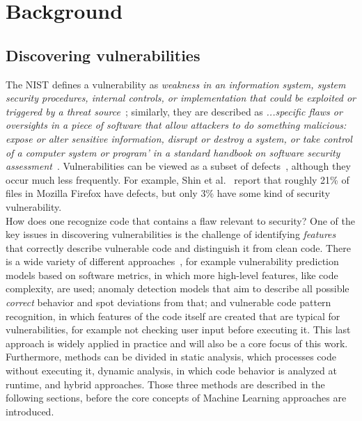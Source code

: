 \documentclass[
a4paper,
pagesize,
pdftex,
12pt,
twoside, %
BCOR=5mm, %
ngerman,
fleqn,
final,
]{scrartcl}
\begin{document}
	\newpage
	\section{Background}\label{Background}
	
	\subsection{Discovering vulnerabilities}
	
	The NIST defines a vulnerability as \textit{weakness in an information system, system security procedures, internal controls, or implementation that could be exploited or triggered by a threat source}~\cite{NISTComputerSecurityRessourceCenter.}; similarly, they are described as \textit{...specific flaws or oversights in a piece of software that allow attackers to do something malicious: expose or alter sensitive information, disrupt or destroy a system, or take control of a computer system or program' in a standard handbook on software security assessment}~\cite{Dowd.2006}.
	Vulnerabilities can be viewed as a subset of defects~\cite{Morrison.2015}, although they occur much less frequently. For example, Shin et al.~\cite{Shin.2013} report that roughly 21\% of files in Mozilla Firefox have defects, but only 3\% have some kind of security vulnerability. \\
	How does one recognize code that contains a flaw relevant to security? One of the key issues in discovering vulnerabilities is the challenge of identifying \textit{features} that correctly describe vulnerable code and distinguish it from clean code. There is a wide variety of different approaches~\cite{Ghaffarian.2017}, for example vulnerability prediction models based on software metrics, in which more high-level features, like code complexity, are used; anomaly detection models that aim to describe all possible \textit{correct} behavior and spot deviations from that; and vulnerable code pattern recognition, in which features of the code itself are created that are typical for vulnerabilities, for example not checking user input before executing it. This last approach is widely applied in practice and will also be a core focus of this work.\\
	Furthermore, methods can be divided in static analysis, which processes code without executing it, dynamic analysis, in which code behavior is analyzed at runtime, and hybrid approaches. Those three methods are described in the following sections, before the core concepts of Machine Learning approaches are introduced.
\end{document}
